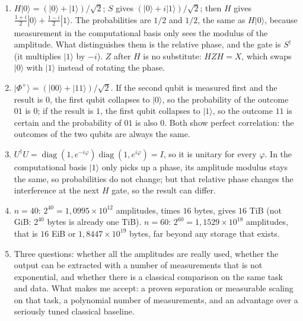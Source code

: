 \begin{enumerate}[label=\textbf{32.\arabic*}]
  \item $H|0\rangle=(|0\rangle+|1\rangle)/\sqrt2$; $S$ gives
        $(|0\rangle+i|1\rangle)/\sqrt2$; then $H$ gives
        $\frac{1+i}{2}|0\rangle+\frac{1-i}{2}|1\rangle$. The probabilities are $1/2$ and $1/2$,
        the same as $H|0\rangle$, because measurement in the computational basis only sees the modulus
        of the amplitude. What distinguishes them is the relative phase, and the gate is $S^{\dagger}$
        (it multiplies $|1\rangle$ by $-i$). $Z$ after $H$ is no substitute: $HZH=X$,
        which swaps $|0\rangle$ with $|1\rangle$ instead of rotating the phase.

  \item $|\Phi^{+}\rangle=(|00\rangle+|11\rangle)/\sqrt2$. If the second qubit is measured
        first and the result is $0$, the first qubit collapses to $|0\rangle$, so the
        probability of the outcome $01$ is $0$; if the result is $1$, the first qubit collapses
        to $|1\rangle$, so the outcome $11$ is certain and the probability of $01$ is also $0$.
        Both show perfect correlation: the outcomes of the two qubits are always the same.

  \item $U^{\dagger}U=\operatorname{diag}(1,e^{-i\varphi})
        \operatorname{diag}(1,e^{i\varphi})=I$, so it is unitary for every
        $\varphi$. In the computational basis $|1\rangle$ only picks up a phase, its
        amplitude modulus stays the same, so probabilities do not change; but that relative phase
        changes the interference at the next $H$ gate, so the result can
        differ.

  \item 
$n=40$: $2^{40}=1{,}0995\times10^{12}$ amplitudes, times $16$ bytes, gives
        $16$ TiB (not GiB: $2^{40}$ bytes is already one TiB). $n=60$:
        $2^{60}=1{,}1529\times10^{18}$ amplitudes, that is $16$ EiB or
        $1{,}8447\times10^{19}$ bytes, far beyond any storage that exists.

  \item Three questions: whether all the amplitudes are really used, whether
        the output can be extracted with a number of measurements that is not exponential,
        and whether there is a classical comparison on the same task and data. What makes
        me accept: a proven separation or measurable scaling on that task,
        a polynomial number of measurements, and an advantage over a seriously tuned
        classical baseline.
\end{enumerate}
